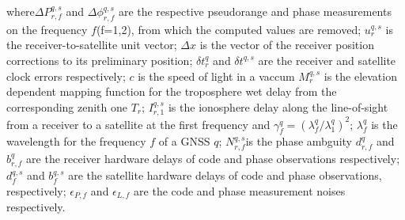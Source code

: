 where$\Delta P_{r,f}^{q,s}$ and $\Delta\phi_{r,f}^{q,s}$ are the respective pseudorange and phase measurements on the frequency $f$(f=1,2), from which the computed values are removed;
$u_r^{q,s}$ is the receiver-to-satellite unit vector;
$\Delta x$ is the vector of the receiver position corrections to its preliminary position; 
$\delta t_r^q$ and $\delta t^{q,s}$ are the receiver and satellite clock errors respectively;
$c$ is the speed of light in a vaccum
$M_r^{q,s}$ is the elevation dependent mapping function for the troposphere wet delay from the corresponding zenith one $T_r$;
$I_{r,1}^{q,s}$ is the ionosphere delay along the line-of-sight from a receiver to a satellite at the first frequency and $\gamma_f^q = (\lambda_f^q / \lambda_1^q)^2$;
$\lambda_f^q$ is the wavelength for the frequency $f$ of a GNSS $q$;
$N_{r,f}^{q,s}$is the phase ambguity 
$d_{r,f}^q$ and $b_{r,f}^q$ are the receiver hardware delays of code and phase observations respectively;
$d_f^{q,s}$ and $b_f^{q,s}$ are the satellite hardware delays of code and phase observations, respectively;
$\epsilon_{P,f}$ and $\epsilon_{L,f}$ are the code and phase measurement noises respectively. 

